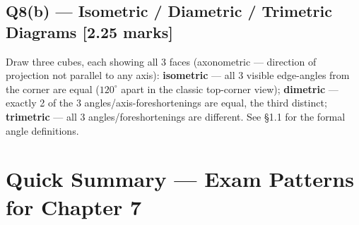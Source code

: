 \documentclass[12pt, a4paper]{article}
\newenvironment{answerbox}{\begin{mdframed}[style=answerframe]}{\end{mdframed}}
\begin{document}
\subsection*{Q8(b) --- Isometric / Diametric / Trimetric Diagrams [2.25 marks]}
\begin{answerbox}
Draw three cubes, each showing all 3 faces (axonometric --- direction of projection not parallel to any axis): \textbf{isometric} --- all 3 visible edge-angles from the corner are equal ($120^\circ$ apart in the classic top-corner view); \textbf{dimetric} --- exactly 2 of the 3 angles/axis-foreshortenings are equal, the third distinct; \textbf{trimetric} --- all 3 angles/foreshortenings are different. See \S1.1 for the formal angle definitions.
\end{answerbox}

\section{Quick Summary --- Exam Patterns for Chapter 7}
\end{document}
